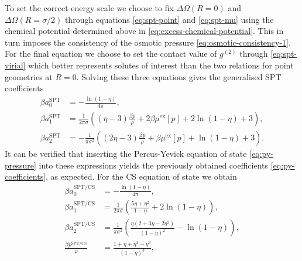 \documentclass[11pt,twoside]{report}
\begin{document}
To set the correct energy scale we choose to fix $\Delta \Omega(R=0)$ and $\Delta \Omega(R=\sigma/2)$ through equations \eqref{eq:spt-point} and \eqref{eq:spt-mu} using the chemical potential determined above in \eqref{eq:excess-chemical-potential}.
This in turn imposes the consistency of the osmotic pressure \eqref{eq:osmotic-consistency-1}.
For the final equation we choose to set the contact value of $g^{(2)}$ through \eqref{eq:spt-virial} which better represents solutes of interest than the two relations for point geometries at $R=0$.
Solving these three equations gives the generalised SPT coefficients
\begin{subequations}\label{eq:general-spt-coefficients}
  \begin{align}
    \beta a_0^\mathrm{SPT}
    &=
    -\frac{\ln{(1- \eta)}}{4\pi},
    \\
    \beta a_1^\mathrm{SPT}
    &=
    \frac{1}{2\pi\sigma} \left(
    (\eta - 3) \frac{\beta p}{\rho}
    + 2 \beta \mu^\mathrm{ex}[p]
    + 2 \ln{(1 - \eta)}
    + 3
    \right),
    \\
    \beta a_2^\mathrm{SPT}
    &=
    - \frac{1}{\pi \sigma^2} \left(
    (2 \eta - 3) \frac{\beta p}{\rho}
    + \beta \mu^\mathrm{ex}[p]
    + \ln{(1 - \eta)}
    + 3
    \right).
 \end{align}
\end{subequations}
It can be verified that inserting the Percus-Yevick equation of state \eqref{eq:py-pressure} into these expressions yields the previously obtained coefficients \eqref{eq:py-coefficients}, as expected.
For the CS equation of state we obtain
\begin{subequations}\label{eq:cs-spt-coefficients}
  \begin{align}
    \beta a_0^\mathrm{SPT/CS}
    &=
    -\frac{\ln{(1- \eta)}}{4\pi},
    \\
    \beta a_1^\mathrm{SPT/CS}
    &=
    \frac{1}{2\pi\sigma} \left(
    \frac{5\eta + \eta^2}{1 - \eta}
    + 2 \ln{(1 - \eta)}
    \right),
    \\
    \beta a_2^\mathrm{SPT/CS}
    &=
    \frac{1}{\pi \sigma^2} \left(
    \frac{\eta (2 + 3\eta - 2\eta^2)}{(1 - \eta)^2}
    - \ln{(1 - \eta)}
    \right),
    \\
    \frac{\beta p^\mathrm{SPT/CS}}{\rho}
    &=
    \frac{1 + \eta + \eta^2 - \eta^3}{(1-\eta)^3},
 \end{align}
\end{subequations}
\end{document}
